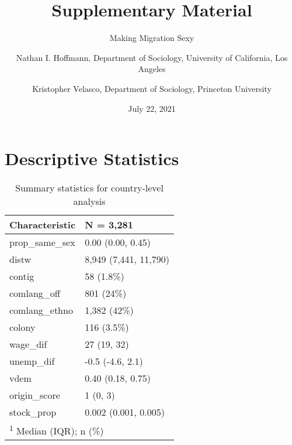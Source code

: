 \documentclass[
  11pt,
]{article}
\title{Supplementary Material}
\subtitle{Making Migration Sexy}
\author{Nathan I. Hoffmann, Department of Sociology, University of California, Los Angeles \and Kristopher Velasco, Department of Sociology, Princeton University}
\date{July 22, 2021}
\begin{document}
\maketitle

{
\hypersetup{linkcolor=}
\setcounter{tocdepth}{2}
\tableofcontents
}
\hypertarget{descriptive-statistics}{%
\section{Descriptive Statistics}\label{descriptive-statistics}}

\begin{table}

\caption{\label{tab:desc-table-country}Summary statistics for country-level analysis}
\centering
\fontsize{8}{10}\selectfont
\begin{tabular}[t]{ll}
\toprule
Characteristic & N = 3,281\\
\midrule
prop\_same\_sex & 0.00 (0.00, 0.45)\\
distw & 8,949 (7,441, 11,790)\\
contig & 58 (1.8\%)\\
comlang\_off & 801 (24\%)\\
comlang\_ethno & 1,382 (42\%)\\
\addlinespace
colony & 116 (3.5\%)\\
wage\_dif & 27 (19, 32)\\
unemp\_dif & -0.5 (-4.6, 2.1)\\
vdem & 0.40 (0.18, 0.75)\\
origin\_score & 1 (0, 3)\\
\addlinespace
stock\_prop & 0.002 (0.001, 0.005)\\
\bottomrule
\multicolumn{2}{l}{\rule{0pt}{1em}\textsuperscript{1} Median (IQR); n (\%)}\\
\end{tabular}
\end{table}
\end{document}
